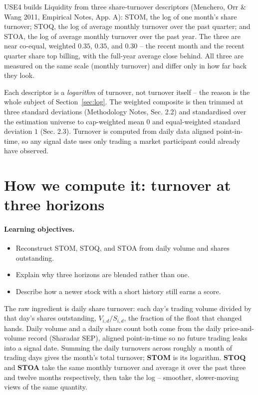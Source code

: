 \documentclass[11pt]{article}
\theoremstyle{definition}
\theoremstyle{plain}
\theoremstyle{remark}
\begin{document}
USE4 builds Liquidity from three share-turnover descriptors (Menchero, Orr \& Wang 2011, Empirical Notes, App. A): STOM, the log of one month's share turnover; STOQ, the log of average monthly turnover over the past quarter; and STOA, the log of average monthly turnover over the past year. The three are near co-equal, weighted $0.35$, $0.35$, and $0.30$ -- the recent month and the recent quarter share top billing, with the full-year average close behind. All three are measured on the same scale (monthly turnover) and differ only in how far back they look.

Each descriptor is a \emph{logarithm} of turnover, not turnover itself -- the reason is the whole subject of Section~\ref{sec:log}. The weighted composite is then trimmed at three standard deviations (Methodology Notes, Sec. 2.2) and standardised over the estimation universe to cap-weighted mean $0$ and equal-weighted standard deviation $1$ (Sec. 2.3). Turnover is computed from daily data aligned point-in-time, so any signal date uses only trading a market participant could already have observed.

\section{How we compute it: turnover at three horizons}\label{sec:compute}

\paragraph{Learning objectives.}
\begin{itemize}[leftmargin=1.4em,topsep=2pt]
  \item Reconstruct STOM, STOQ, and STOA from daily volume and shares outstanding.
  \item Explain why three horizons are blended rather than one.
  \item Describe how a newer stock with a short history still earns a score.
\end{itemize}

The raw ingredient is daily share turnover: each day's trading volume divided by that day's shares outstanding, $V_{i,d}/S_{i,d}$, the fraction of the float that changed hands. Daily volume and a daily share count both come from the daily price-and-volume record (Sharadar SEP), aligned point-in-time so no future trading leaks into a signal date. Summing the daily turnovers across roughly a month of trading days gives the month's total turnover; \textbf{STOM} is its logarithm. \textbf{STOQ} and \textbf{STOA} take the same monthly turnover and average it over the past three and twelve months respectively, then take the log -- smoother, slower-moving views of the same quantity.
\end{document}
